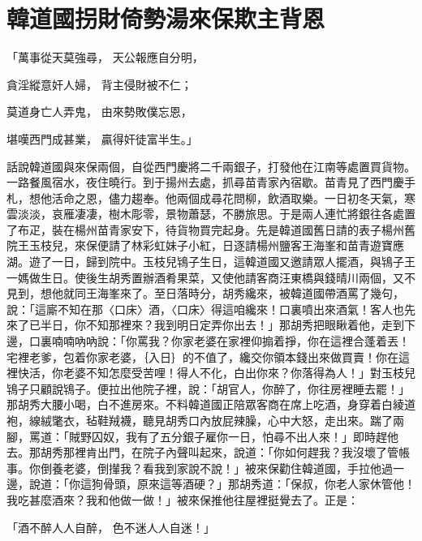 %

\chapter{韓道國拐財倚勢\KG 湯來保欺主背恩}

「萬事從天莫強尋，  天公報應自分明，

貪淫縱意奸人婦，  背主侵財被不仁；

莫道身亡人弄鬼，  由來勢敗僕忘恩，

堪嘆西門成甚業，  贏得奸徒富半生。」

話說韓道國與來保兩個，自從西門慶將二千兩銀子，打發他在江南等處置買貨物。一路餐風宿水，夜住曉行。到于揚州去處，抓尋苗青家內宿歇。苗青見了西門慶手札，想他活命之恩，儘力趨奉。他兩個成尋花問柳，飲酒取樂。一日初冬天氣，寒雲淡淡，哀雁凄凄，樹木彫零，景物蕭瑟，不勝旅思。于是兩人連忙將銀往各處置了布疋，裝在楊州苗青家安下，待貨物買完起身。先是韓道國舊日請的表子楊州舊院王玉枝兒，來保便請了林彩虹妹子小紅，日逐請楊州鹽客王海峯和苗青遊寶應湖。遊了一日，歸到院中。玉枝兒鴇子生日，這韓道國又邀請眾人擺酒，與鴇子王一媽做生日。使後生胡秀置辦酒肴果菜，又使他請客商汪東橋與錢晴川兩個，又不見到，想他就同王海峯來了。至日落時分，胡秀纔來，被韓道國帶酒罵了幾句，說：「這廝不知在那〈口床〉酒，〈口床〉得這咱纔來！口裏噴出來酒氣！客人也先來了已半日，你不知那裡來？我到明日定弄你出去！」那胡秀把眼瞅着他，走到下邊，口裏喃喃吶吶說：「你罵我？你家老婆在家裡仰搧着掙，你在這裡合蓬着丟！宅裡老爹，包着你家老婆，｛入日｝的不值了，纔交你領本錢出來做買賣！你在這裡快活，你老婆不知怎麼受苦哩！得人不化，白出你來？你落得為人！」對玉枝兒鴇子只顧說鴇子。便拉出他院子裡，說：「胡官人，你醉了，你往房裡睡去罷！」那胡秀大腰小喝，白不進房來。不料韓道國正陪眾客商在席上吃酒，身穿着白綾道袍，線絨氅衣，毡鞋羢襪，聽見胡秀口內放屁辣臊，心中大怒，走出來。踹了兩腳，罵道：「賊野囚奴，我有了五分銀子雇你一日，怕尋不出人來！」即時趕他去。那胡秀那裡肯出門，在院子內聲叫起來，說道：「你如何趕我？我沒壞了管帳事。你倒養老婆，倒攆我？看我到家說不說！」被來保勸住韓道國，手拉他過一邊，說道：「你這狗骨頭，原來這等酒硬？」那胡秀道：「保叔，你老人家休管他！我吃甚麼酒來？我和他做一做！」被來保推他往屋裡挺覺去了。正是：

「酒不醉人人自醉，  色不迷人人自迷！」

